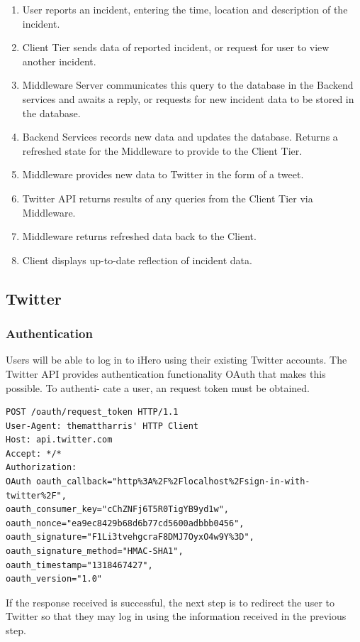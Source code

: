 \documentclass{sig-alt-release2}
\begin{document}
\begin{enumerate}
\item    User reports an incident, entering the time, location and description of the incident.
\item    Client Tier sends data of reported incident, or request for user to view another incident.
\item    Middleware Server communicates this query to the database in the Backend services and awaits a reply, or requests for new incident data to be stored in the database.
\item    Backend Services records new data and updates the database. Returns a refreshed state for the Middleware to provide to the Client Tier.
\item    Middleware provides new data to Twitter in the form of a tweet.
\item    Twitter API returns results of any queries from the Client Tier via Middleware.
\item    Middleware returns refreshed data back to the Client.
\item    Client displays up-to-date reflection of incident data.
\end{enumerate}

\subsection{Twitter}

\subsubsection{Authentication}

Users will be able to log in to iHero using their existing
Twitter accounts. The Twitter API provides authentication
functionality OAuth that makes this possible. To authenti-
cate a user, an request token must be obtained.

\tiny
\begin{verbatim}
POST /oauth/request_token HTTP/1.1
User-Agent: themattharris' HTTP Client
Host: api.twitter.com
Accept: */*
Authorization:
OAuth oauth_callback="http%3A%2F%2Flocalhost%2Fsign-in-with-twitter%2F",
oauth_consumer_key="cChZNFj6T5R0TigYB9yd1w",
oauth_nonce="ea9ec8429b68d6b77cd5600adbbb0456",
oauth_signature="F1Li3tvehgcraF8DMJ7OyxO4w9Y%3D",
oauth_signature_method="HMAC-SHA1",
oauth_timestamp="1318467427",
oauth_version="1.0"
\end{verbatim}
\normalsize

If the response received is successful, the next step is to
redirect the user to Twitter so that they may log in using
the information received in the previous step.
\end{document}
